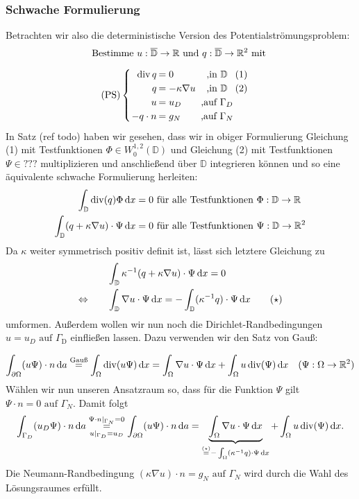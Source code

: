 \subsubsection{Schwache Formulierung}
Betrachten wir also die deterministische Version des Potentialströmungsproblem:
\[ \text{Bestimme } u:\overline{\mathbb{D}} \to \R \text{ und } q: \overline{\mathbb{D}} \to \R^2 \text{ mit } \newline \]
\[\setlength\arraycolsep{1pt}
\text{(PS)}\begin{cases} 
\begin{array}{rlcr}
\dive q     &= 0                 &\text{ ,} \text{in } \mathbb{D} &(1)\\
q           &= - \kappa \nabla u &\text{ ,} \text{in }\mathbb{D} &(2)\\
u           &= u_D               &\text{ ,} \text{auf } \Gamma_D \\
-q \cdot n  &= g_N               &\text{ ,} \text{auf } \Gamma_N 
\end{array}
\end{cases} 
\]
In Satz (ref todo) haben wir gesehen, dass wir in obiger Formulierung Gleichung (1) mit Testfunktionen $\Phi \in W_0^{1,2}(\mathbb{D})$ und Gleichung (2) mit Testfunktionen $\Psi \in ??? $ multiplizieren und anschließend über $\mathbb{D}$ integrieren können und so eine äquivalente schwache Formulierung herleiten:
\begin{align*}
	\int_{\mathbb{D}} \operatorname{div}(q) \Phi \, \mathrm{d} x &= 0 \text{ für alle Testfunktionen } \Phi : \mathbb{D} \to \mathbb{R} \\
	\int_{\mathbb{D}} (q + \kappa \nabla u) \cdot \Psi \, \mathrm{d} x &= 0 \text{ für alle Testfunktionen } \Psi : \mathbb{D} \to \mathbb{R}^2
\end{align*}
Da $\kappa$ weiter symmetrisch positiv definit ist, lässt sich letztere Gleichung zu 
\begin{align*}
	&\int_{\mathbb{D}} \kappa^{-1} (q + \kappa \nabla u) \cdot \Psi \, \mathrm{d} x = 0 \\
	\Leftrightarrow \qquad &\int_{\mathbb{D}} \nabla u \cdot \Psi \, \mathrm{d} x = - \int_{\mathbb{D}} (\kappa^{-1}q)\cdot \Psi \, \mathrm{d} x \qquad (\star) 
\end{align*}
umformen. Außerdem wollen wir nun noch die Dirichlet-Randbedingungen $u = u_D \text{ auf } \Gamma_{\text{D}}$ einfließen lassen. Dazu verwenden wir den Satz von Gauß:


\[ \int_{\partial\Omega} (u\Psi) \cdot n \, \mathrm{d} a \stackrel{\text{Gauß}}{=} 
 \int_{\Omega} \operatorname{div}(u\Psi) \, \mathrm{d} x = \int_{\Omega} \nabla u \cdot \Psi \, \mathrm{d} x + \int_{\Omega} u \operatorname{div}(\Psi) \, \mathrm{d} x \quad (\Psi:\Omega \to \mathbb{R}^2) \]
Wählen wir nun unseren Ansatzraum so, dass  für die Funktion $ \Psi$ gilt $ \Psi \cdot n = 0 \text{ auf } \Gamma_N $. Damit folgt
\begin{align*}
\int_{\Gamma_D} (u_D\Psi) \cdot n \, \mathrm{d} a \overset{\Psi \cdot n|_{\Gamma_N} = 0}{\underset{u |_{\Gamma_D} = u_D} {=}} \int_{\partial\Omega} (u\Psi) \cdot n \, \mathrm{d} a = \underbrace{\int_{\Omega} \nabla u \cdot \Psi \, \mathrm{d} x}_{\stackrel{(\star)}{=}- \int_{\Omega} (\kappa^{-1} q) \cdot \Psi \, \mathrm{d} x } + \int_{\Omega} u \operatorname{div}(\Psi) \, \mathrm{d} x.
\end{align*}
Die Neumann-Randbedingung $ (\kappa\nabla u) \cdot n = g_N \text{ auf } \Gamma_N $ wird durch die Wahl des Lösungsraumes erfüllt.


